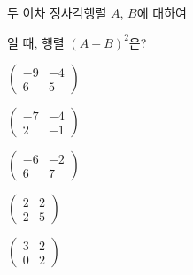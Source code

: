 두 이차 정사각행렬 $A$, $B$에 대하여\par\smallskip{}\par\smallskip\noindent 일 때, 행렬 $(A+B)^2$은?
\begin{choicesii}{\rule[-3.0ex]{0pt}{8.0ex}$\begin{pmatrix} -9 & -4 \\ 6 & 5 \end{pmatrix}$}{\rule[-3.0ex]{0pt}{8.0ex}$\begin{pmatrix} -7 & -4 \\ 2 & -1 \end{pmatrix}$}{\rule[-3.0ex]{0pt}{8.0ex}$\begin{pmatrix} -6 & -2 \\ 6 & 7 \end{pmatrix}$}{\rule[-3.0ex]{0pt}{8.0ex}$\begin{pmatrix} 2 & 2 \\ 2 & 5 \end{pmatrix}$}{\rule[-3.0ex]{0pt}{8.0ex}$\begin{pmatrix} 3 & 2 \\ 0 & 2 \end{pmatrix}$}\end{choicesii}
